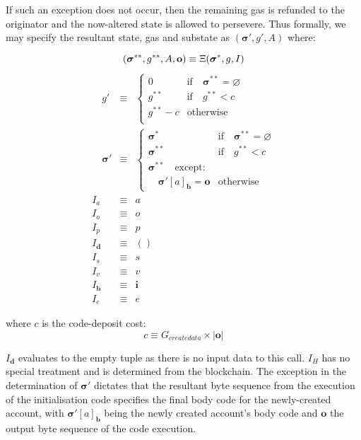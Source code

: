 \documentclass[9pt,oneside]{amsart}
\begin{document}
\begin{multicols}{2}
If such an exception does not occur, then the remaining gas is refunded to the originator and the now-altered state is allowed to persevere. Thus formally, we may specify the resultant state, gas and substate as $(\boldsymbol{\sigma}', g', A)$ where:

\begin{equation}
(\boldsymbol{\sigma}^{**}, g^{**}, A, \mathbf{o}) \equiv \Xi(\boldsymbol{\sigma}^*, g, I) \\
\end{equation}
\begin{eqnarray}
\quad g' & \equiv & \begin{cases}
0 & \text{if} \quad \boldsymbol{\sigma}^{**} = \varnothing \\
g^{**} & \text{if} \quad g^{**} < c \\
g^{**} - c & \text{otherwise} \\
\end{cases} \\
\quad \boldsymbol{\sigma}' & \equiv & \begin{cases}
\boldsymbol{\sigma}^* & \text{if} \quad \boldsymbol{\sigma}^{**} = \varnothing \\
\boldsymbol{\sigma}^{**} & \text{if} \quad g^{**} < c \\
\boldsymbol{\sigma}^{**} \quad \text{except:} & \\
\quad\boldsymbol{\sigma}'[a]_{\mathbf{b}} = \mathbf{o} & \text{otherwise}
\end{cases} \\
I_a & \equiv & a \\
I_o & \equiv & o \\
I_p & \equiv & p \\
I_\mathbf{d} & \equiv & () \\
I_s & \equiv & s \\
I_v & \equiv & v \\
I_\mathbf{b} & \equiv & \mathbf{i} \\
I_e & \equiv & e
\end{eqnarray}

where $c$ is the code-deposit cost:
\begin{equation}
c \equiv G_{createdata} \times |\mathbf{o}|
\end{equation}

$I_\mathbf{d}$ evaluates to the empty tuple as there is no input data to this call. $I_H$ has no special treatment and is determined from the blockchain. The exception in the determination of $\boldsymbol{\sigma}'$ dictates that the resultant byte sequence from the execution of the initialisation code specifies the final body code for the newly-created account, with $\boldsymbol{\sigma}'[a]_{\mathbf{b}}$ being the newly created account's body code and $\mathbf{o}$ the output byte sequence of the code execution.


\end{multicols}
\end{document}

